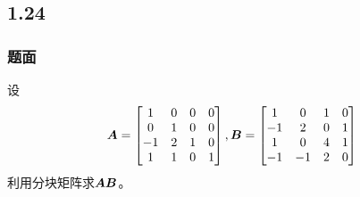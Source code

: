 \documentclass[9pt,xcolor=svgnames]{beamer} %
\begin{document}
\subsection*{1.24}
\begin{frame}
    \frametitle{题面}
    设
    \begin{equation*}
        \boldsymbol{A}=\begin{bmatrix}1&0&0&0\\0&1&0&0\\-1&2&1&0\\1&1&0&1\end{bmatrix},
        \boldsymbol{B}=\begin{bmatrix}1&0&1&0\\-1&2&0&1\\1&0&4&1\\-1&-1&2&0\end{bmatrix}
    \end{equation*}
    利用分块矩阵求\(\boldsymbol{A}\boldsymbol{B}\)。
\end{frame}
\end{document}
